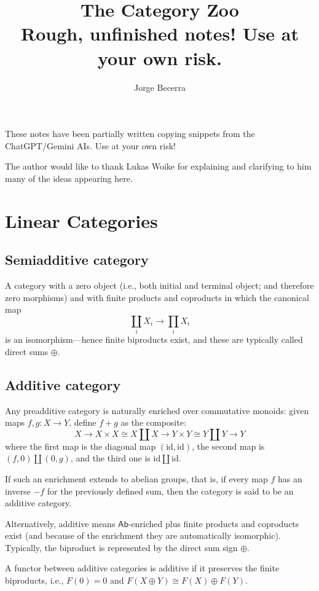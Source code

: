 \documentclass[11pt]{article}
\title{The Category Zoo \\{\small Rough, unfinished notes! Use at your own risk.}}
\author{Jorge Becerra}
\theoremstyle{definition}
\begin{document}
\maketitle

\tableofcontents

\vspace{1cm}

These notes have been partially written copying snippets from the ChatGPT/Gemini AIs. Use at your own risk!

The author would like to thank Lukas Woike for explaining and clarifying to him many of the ideas appearing here.



\section{Linear Categories}

\subsection{Semiadditive category}
A category with a zero object (i.e., both initial and terminal object; and therefore zero morphisms) and with
finite products and coproducts in which the canonical map
\[
\coprod_i X_i \to \prod_i X_i
\]
is an isomorphism---hence finite biproducts exist, and these are typically called direct sums $\oplus$.

\subsection{Additive category}
Any preadditive category is naturally enriched over commutative monoids: given maps $f, g: X \to Y$, define
$f+g$ as the composite:
\[
X \to X \times X \cong X \amalg X \to Y \times Y \cong Y \amalg Y \to Y
\]
where the first map is the diagonal map $(\mathrm{id}, \mathrm{id})$, the second map is $(f,0) \amalg (0,g)$, and the third
one is $\mathrm{id} \amalg \mathrm{id}$.

If such an enrichment extends to abelian groups, that is, if every map $f$ has an inverse $-f$ for the
previously defined sum, then the category is said to be an additive category.

Alternatively, additive means $\mathsf{Ab}$-enriched plus finite products and coproducts exist (and because of the
enrichment they are automatically isomorphic). Typically, the biproduct is represented by the direct sum sign $\oplus$.

A functor between additive categories is additive if it preserves the finite biproducts, i.e., $F(0) = 0$ and $F(X \oplus Y) \cong F(X) \oplus F(Y)$.
\end{document}
